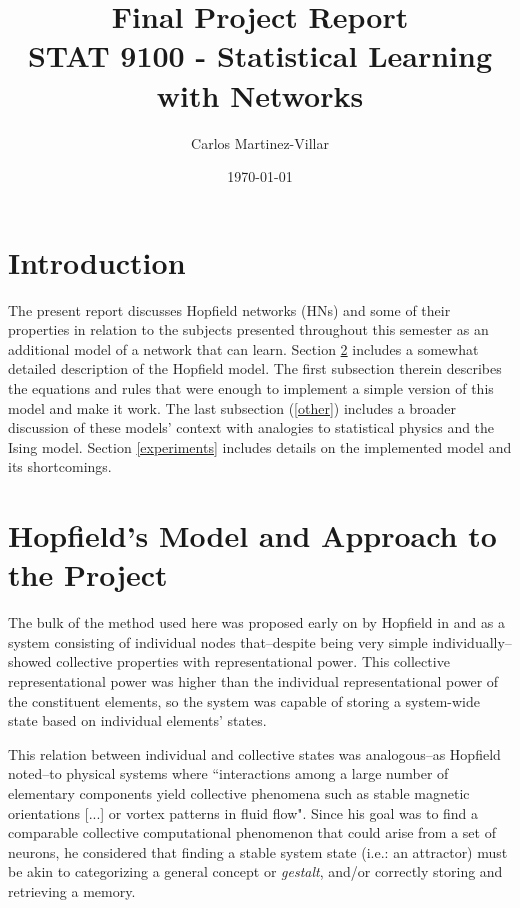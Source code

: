 \documentclass[11pt]{article}
\title{Final Project Report\\STAT 9100 - Statistical Learning with Networks}
\author{Carlos Martinez-Villar}
\date{\today}
\begin{document}
	\section{Introduction}
	The present report discusses Hopfield networks (HNs) and some of their properties in relation to the subjects presented throughout this semester as an additional model of a network that can learn. Section \ref{model} includes a somewhat detailed description of the Hopfield model. 
	The first subsection therein describes the equations and rules that were enough to implement a simple version of this model and make it work.
	The last subsection (\ref{other}) includes a broader discussion of these models' context with analogies to statistical physics and the Ising model. 
	Section \ref{experiments} includes details on the implemented model and its shortcomings. 
	

	\section{Hopfield's Model and Approach to the Project}\label{model}
	
	The bulk of the method used here was proposed early on by Hopfield in \cite{hopfield1982neural}  and \cite{hopfield1984neurons} as a system consisting of individual nodes that–despite being very simple individually–showed collective properties with representational power. 
	This collective representational power was higher than the individual representational power of the constituent elements, so the system was capable of storing a system-wide state based on individual elements' states. 
	
	This relation between individual and collective states was analogous–as Hopfield noted–to physical systems where ``interactions among a large number of elementary components yield collective phenomena such as stable magnetic orientations [...] or vortex patterns in fluid flow". 
	Since his goal was to find a comparable collective computational phenomenon that could arise from a set of neurons, he considered that finding a stable system state (i.e.: an attractor) must be akin to categorizing a general concept or \textit{gestalt}, and/or correctly storing and retrieving a memory.
	
\end{document}
